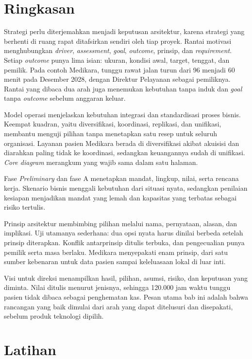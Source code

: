 \section{Ringkasan}

Strategi perlu diterjemahkan menjadi keputusan arsitektur, karena strategi yang berhenti
di ruang rapat ditafsirkan sendiri oleh tiap proyek. Rantai motivasi menghubungkan
\textit{driver}, \textit{assessment}, \textit{goal}, \textit{outcome}, prinsip, dan
\textit{requirement}. Setiap \textit{outcome} punya lima isian: ukuran, kondisi awal,
target, tenggat, dan pemilik. Pada contoh Medikara, tunggu rawat jalan turun dari 96
menjadi 60 menit pada Desember 2028, dengan Direktur Pelayanan sebagai pemiliknya.
Rantai yang dibaca dua arah juga menemukan kebutuhan tanpa induk dan \textit{goal} tanpa
\textit{outcome} sebelum anggaran keluar.

Model operasi menjelaskan kebutuhan integrasi dan standardisasi proses bisnis. Keempat
kuadran, yaitu diversifikasi, koordinasi, replikasi, dan unifikasi, membantu menguji
pilihan tanpa menetapkan satu resep untuk seluruh organisasi. Layanan pasien Medikara
berada di diversifikasi akibat akuisisi dan diarahkan paling tidak ke koordinasi,
sedangkan keuangannya sudah di unifikasi. \textit{Core diagram} merangkum yang wajib sama
dalam satu halaman.

Fase \textit{Preliminary} dan fase A menetapkan mandat, lingkup, nilai, serta rencana kerja.
Skenario bisnis menggali kebutuhan dari situasi nyata, sedangkan penilaian kesiapan
menjadikan mandat yang lemah dan kapasitas yang terbatas sebagai risiko tertulis.

Prinsip arsitektur membimbing pilihan melalui nama, pernyataan, alasan, dan implikasi.
Uji utamanya sederhana: dua opsi nyata harus dinilai berbeda setelah prinsip diterapkan.
Konflik antarprinsip ditulis terbuka, dan pengecualian punya pemilik serta masa berlaku.
Medikara menyepakati enam prinsip, dari satu sumber kebenaran untuk data pasien sampai
keleluasaan lokal di luar inti.

Visi untuk direksi menampilkan hasil, pilihan, asumsi, risiko, dan keputusan yang diminta.
Nilai ditulis menurut jenisnya, sehingga 120.000 jam waktu tunggu pasien tidak dibaca
sebagai penghematan kas. Pesan utama bab ini adalah bahwa rancangan yang baik dimulai dari
arah yang dapat ditelusuri dan disepakati, sebelum produk teknologi dipilih.

\section{Latihan}

